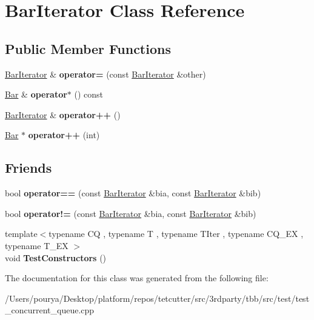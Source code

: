 \hypertarget{classBarIterator}{}\section{Bar\+Iterator Class Reference}
\label{classBarIterator}
\subsection*{Public Member Functions}
\begin{DoxyCompactItemize}
\item 
\hypertarget{classBarIterator_a45d8a3677b8120342843456ae20e0854}{}\hyperlink{classBarIterator}{Bar\+Iterator} \& {\bfseries operator=} (const \hyperlink{classBarIterator}{Bar\+Iterator} \&other)\label{classBarIterator_a45d8a3677b8120342843456ae20e0854}

\item 
\hypertarget{classBarIterator_a29c463760690add96d01001e6d795d81}{}\hyperlink{classBar}{Bar} \& {\bfseries operator$\ast$} () const \label{classBarIterator_a29c463760690add96d01001e6d795d81}

\item 
\hypertarget{classBarIterator_a7a879ce09637eaa4b0379d5c7b11c87c}{}\hyperlink{classBarIterator}{Bar\+Iterator} \& {\bfseries operator++} ()\label{classBarIterator_a7a879ce09637eaa4b0379d5c7b11c87c}

\item 
\hypertarget{classBarIterator_a740068881884782bdb970327caae1729}{}\hyperlink{classBar}{Bar} $\ast$ {\bfseries operator++} (int)\label{classBarIterator_a740068881884782bdb970327caae1729}

\end{DoxyCompactItemize}
\subsection*{Friends}
\begin{DoxyCompactItemize}
\item 
\hypertarget{classBarIterator_a2053538cbe91c7b29f1eb2e7f14d40de}{}bool {\bfseries operator==} (const \hyperlink{classBarIterator}{Bar\+Iterator} \&bia, const \hyperlink{classBarIterator}{Bar\+Iterator} \&bib)\label{classBarIterator_a2053538cbe91c7b29f1eb2e7f14d40de}

\item 
\hypertarget{classBarIterator_ac1821c5773dae455bbdcda98fef07748}{}bool {\bfseries operator!=} (const \hyperlink{classBarIterator}{Bar\+Iterator} \&bia, const \hyperlink{classBarIterator}{Bar\+Iterator} \&bib)\label{classBarIterator_ac1821c5773dae455bbdcda98fef07748}

\item 
\hypertarget{classBarIterator_a5c2b9816f505fd313911615b67342c8d}{}{\footnotesize template$<$typename C\+Q , typename T , typename T\+Iter , typename C\+Q\+\_\+\+E\+X , typename T\+\_\+\+E\+X $>$ }\\void {\bfseries Test\+Constructors} ()\label{classBarIterator_a5c2b9816f505fd313911615b67342c8d}

\end{DoxyCompactItemize}


The documentation for this class was generated from the following file\+:\begin{DoxyCompactItemize}
\item 
/\+Users/pourya/\+Desktop/platform/repos/tetcutter/src/3rdparty/tbb/src/test/test\+\_\+concurrent\+\_\+queue.\+cpp\end{DoxyCompactItemize}
